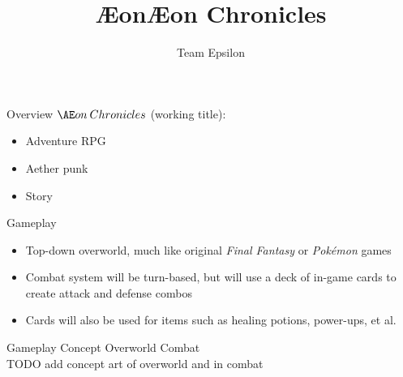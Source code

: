 \documentclass{teamepsilon}
\title{\AE on}
\title{{\AE}on Chronicles}
\author{Team Epsilon}
\institute{Colorado School of Mines}
\begin{document}
\begin{frame}{Overview}
	$\AE on\:Chronicles$ (working title):\\
	\begin{itemize}
		\item Adventure RPG
		\item Aether punk
		\item Story
	\end{itemize}
\end{frame}

\begin{frame}{Gameplay}
    \begin{itemize}
        \item Top-down overworld, much like original \textit{Final Fantasy}
        or \textit{Pok\'emon} games
        \item Combat system will be turn-based, but will use a deck of in-game
        cards to create attack and defense combos
        \item Cards will also be used for items such as healing potions,
        power-ups, et al.
    \end{itemize}
\end{frame}

\begin{frame}{Gameplay Concept}
Overworld \hfill Combat \\
TODO add concept art of overworld and in combat
\end{frame}
\end{document}
